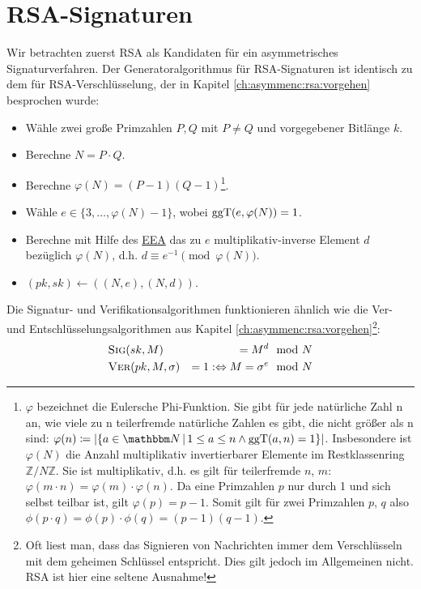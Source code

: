 \section{RSA-Signaturen}\label{sec:rsa}\indexRSA
 Wir betrachten zuerst RSA als
Kandidaten für ein asymmetrisches Signaturverfahren. Der
Generatoralgorithmus für RSA-Signaturen ist identisch zu dem für
RSA-Verschlüsselung, der in Kapitel \ref{ch:asymmenc:rsa:vorgehen}
besprochen wurde:
\begin{itemize}
\item Wähle zwei große Primzahlen $P, Q$ mit $P \neq Q$ und
  vorgegebener Bitlänge $k$.
\item Berechne $N = P \cdot Q$.
\item Berechne $\varphi(N) = (P - 1)(Q - 1)$\footnote{$\varphi$
    bezeichnet die Eulersche Phi-Funktion. Sie gibt für jede natürliche Zahl
    n an, wie viele zu n teilerfremde natürliche Zahlen es gibt, die nicht
    größer als n sind: $\varphi(n) \coloneqq \vert \{a\in\N \, |\, 1 \le a \le n
    \land \operatorname{ggT}(a,n) = 1 \} \vert$. Insbesondere ist
    $\varphi(N)$ die Anzahl multiplikativ invertierbarer Elemente im
    Restklassenring $\mathbb{Z}/N\mathbb{Z}$.  Sie ist multiplikativ,
    d.h. es gilt für teilerfremde $n$, $m$: $\varphi(m\cdot n) = \varphi(m)
    \cdot \varphi(n)$. Da eine Primzahlen $p$ nur durch 1 und sich selbst
    teilbar ist, gilt $\varphi(p) = p-1$. Somit gilt für zwei Primzahlen
    $p$, $q$ also $\phi(p \cdot q) = \phi(p) \cdot \phi(q) = (p-1)(q-1)$.}.
\item Wähle $e \in \{3, \dotsc, \varphi(N) - 1\}$, wobei
  $\operatorname{ggT}(e, \varphi(N)) = 1$.
\item Berechne mit Hilfe des \hyperref[ssec:eea]{EEA} das zu $e$
  multiplikativ-inverse Element $d$ bezüglich $\varphi(N)$, d.h. $d \equiv
  e^{-1} \pmod{\varphi(N)}$.
\item $(pk, sk)\leftarrow ((N,e), (N,d))$.
\end{itemize} Die Signatur- und Verifikationsalgorithmen funktionieren
ähnlich wie die Ver- und Entschlüsselungsalgorithmen aus Kapitel
\ref{ch:asymmenc:rsa:vorgehen}\footnote{Oft liest man, dass das
  Signieren von Nachrichten immer dem Verschlüsseln mit dem geheimen
  Schlüssel entspricht. Dies gilt jedoch im Allgemeinen nicht. RSA ist
  hier eine seltene Ausnahme!}:
\begin{alignat*}{3} & \textsc{Sig}(sk, M) & = M^d & \mod N\\ &
  \textsc{Ver}(pk, M, \sigma) & = 1 : \Leftrightarrow M = \sigma^e
  & \mod N
\end{alignat*}

